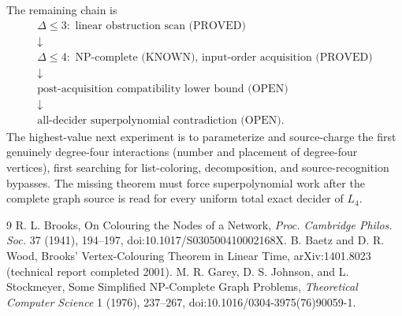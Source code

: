 \documentclass[11pt]{article}
\begin{document}
The remaining chain is
\[
\begin{array}{c}
\Delta\le3:\text{ linear obstruction scan (PROVED)}\\
\downarrow\\
\Delta\le4:\text{ NP-complete (KNOWN), input-order acquisition (PROVED)}\\
\downarrow\\
\text{post-acquisition compatibility lower bound (OPEN)}\\
\downarrow\\
\text{all-decider superpolynomial contradiction (OPEN).}
\end{array}
\]
The highest-value next experiment is to parameterize and source-charge the
first genuinely degree-four interactions (number and placement of degree-four
vertices), first searching for list-coloring, decomposition, and
source-recognition bypasses. The missing theorem must force superpolynomial
work after the complete graph source is read for every uniform total exact
decider of \(L_4\).

\begin{thebibliography}{9}
R. L. Brooks, On Colouring the Nodes of a Network,
\emph{Proc. Cambridge Philos. Soc.} 37 (1941), 194--197,
doi:10.1017/S030500410002168X.
B. Baetz and D. R. Wood, Brooks' Vertex-Colouring Theorem in Linear Time,
arXiv:1401.8023 (technical report completed 2001).
M. R. Garey, D. S. Johnson, and L. Stockmeyer,
Some Simplified NP-Complete Graph Problems,
\emph{Theoretical Computer Science} 1 (1976), 237--267,
doi:10.1016/0304-3975(76)90059-1.
\end{thebibliography}
\end{document}
